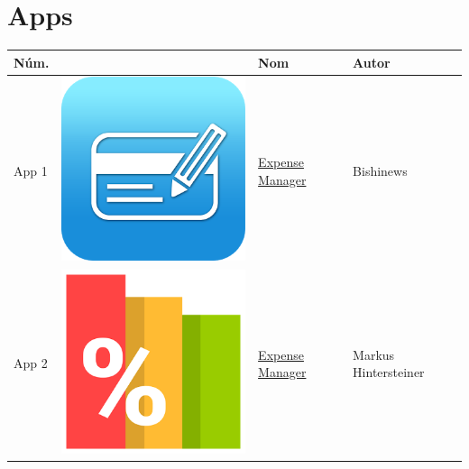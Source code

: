 
\printglossary


\chapter*{Apps}
\label{sec:apps}

\begin{tabular}{ | l | c | l | l | }
\hline
\textbf{Núm.} &  & \textbf{Nom} & \textbf{Autor} \\
\hline
App 1 & \includegraphics[scale=0.05]{A01_icon.png} & \href{https://play.google.com/store/apps/details?id=com.expensemanager}{Expense Manager} & Bishinews \\

App 2 & \includegraphics[scale=0.05]{A02_icon.png} & \href{https://play.google.com/store/apps/details?id=at.markushi.expensemanager}{Expense Manager} & Markus Hintersteiner \\


\end{tabular}
